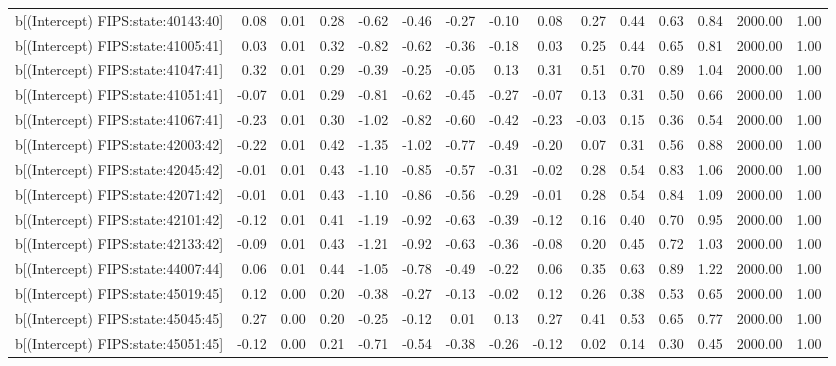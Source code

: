 \begin{table}[ht]
\begin{tabular}{rrrrrrrrrrrrrrr}
  b[(Intercept) FIPS:state:40143:40] & 0.08 & 0.01 & 0.28 & -0.62 & -0.46 & -0.27 & -0.10 & 0.08 & 0.27 & 0.44 & 0.63 & 0.84 & 2000.00 & 1.00 \\ 
  b[(Intercept) FIPS:state:41005:41] & 0.03 & 0.01 & 0.32 & -0.82 & -0.62 & -0.36 & -0.18 & 0.03 & 0.25 & 0.44 & 0.65 & 0.81 & 2000.00 & 1.00 \\ 
  b[(Intercept) FIPS:state:41047:41] & 0.32 & 0.01 & 0.29 & -0.39 & -0.25 & -0.05 & 0.13 & 0.31 & 0.51 & 0.70 & 0.89 & 1.04 & 2000.00 & 1.00 \\ 
  b[(Intercept) FIPS:state:41051:41] & -0.07 & 0.01 & 0.29 & -0.81 & -0.62 & -0.45 & -0.27 & -0.07 & 0.13 & 0.31 & 0.50 & 0.66 & 2000.00 & 1.00 \\ 
  b[(Intercept) FIPS:state:41067:41] & -0.23 & 0.01 & 0.30 & -1.02 & -0.82 & -0.60 & -0.42 & -0.23 & -0.03 & 0.15 & 0.36 & 0.54 & 2000.00 & 1.00 \\ 
  b[(Intercept) FIPS:state:42003:42] & -0.22 & 0.01 & 0.42 & -1.35 & -1.02 & -0.77 & -0.49 & -0.20 & 0.07 & 0.31 & 0.56 & 0.88 & 2000.00 & 1.00 \\ 
  b[(Intercept) FIPS:state:42045:42] & -0.01 & 0.01 & 0.43 & -1.10 & -0.85 & -0.57 & -0.31 & -0.02 & 0.28 & 0.54 & 0.83 & 1.06 & 2000.00 & 1.00 \\ 
  b[(Intercept) FIPS:state:42071:42] & -0.01 & 0.01 & 0.43 & -1.10 & -0.86 & -0.56 & -0.29 & -0.01 & 0.28 & 0.54 & 0.84 & 1.09 & 2000.00 & 1.00 \\ 
  b[(Intercept) FIPS:state:42101:42] & -0.12 & 0.01 & 0.41 & -1.19 & -0.92 & -0.63 & -0.39 & -0.12 & 0.16 & 0.40 & 0.70 & 0.95 & 2000.00 & 1.00 \\ 
  b[(Intercept) FIPS:state:42133:42] & -0.09 & 0.01 & 0.43 & -1.21 & -0.92 & -0.63 & -0.36 & -0.08 & 0.20 & 0.45 & 0.72 & 1.03 & 2000.00 & 1.00 \\ 
  b[(Intercept) FIPS:state:44007:44] & 0.06 & 0.01 & 0.44 & -1.05 & -0.78 & -0.49 & -0.22 & 0.06 & 0.35 & 0.63 & 0.89 & 1.22 & 2000.00 & 1.00 \\ 
  b[(Intercept) FIPS:state:45019:45] & 0.12 & 0.00 & 0.20 & -0.38 & -0.27 & -0.13 & -0.02 & 0.12 & 0.26 & 0.38 & 0.53 & 0.65 & 2000.00 & 1.00 \\ 
  b[(Intercept) FIPS:state:45045:45] & 0.27 & 0.00 & 0.20 & -0.25 & -0.12 & 0.01 & 0.13 & 0.27 & 0.41 & 0.53 & 0.65 & 0.77 & 2000.00 & 1.00 \\ 
  b[(Intercept) FIPS:state:45051:45] & -0.12 & 0.00 & 0.21 & -0.71 & -0.54 & -0.38 & -0.26 & -0.12 & 0.02 & 0.14 & 0.30 & 0.45 & 2000.00 & 1.00 \\ 

\end{tabular}
\end{table}
